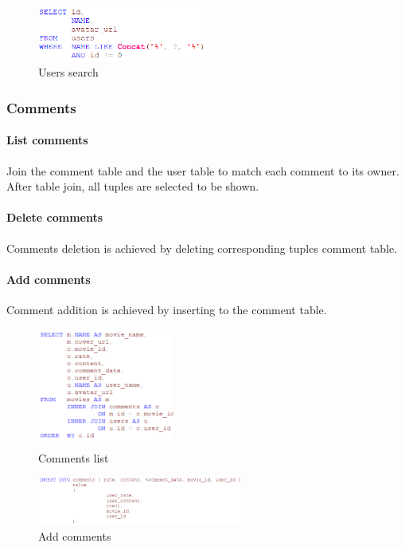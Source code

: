 \begin{CJK*}{UTF8}{gbsn}
\begin{figure}[htbp]
\centering
\includegraphics[width=0.5\textwidth]{u_search.png}
\caption{Users search}
\end{figure}








\subsubsection{Comments}
\paragraph{List comments}
Join the comment table and the user table to match each comment to its owner. After table join, all tuples are selected to be shown. 




\paragraph{Delete comments} 
Comments deletion is achieved by deleting corresponding tuples comment table.


\paragraph{Add comments} 
Comment addition is achieved by inserting to the comment table.


\begin{figure}[h]
    \label{comment}
    \centering
    \includegraphics[width=0.4\textwidth]{comment.png}
    \caption{Comments list}
\end{figure}


\begin{figure}[h]
    \label{comment}
    \centering
    \includegraphics[width=0.6\textwidth]{add_comm.png}
    \caption{Add comments}
\end{figure}


\end{CJK*}

